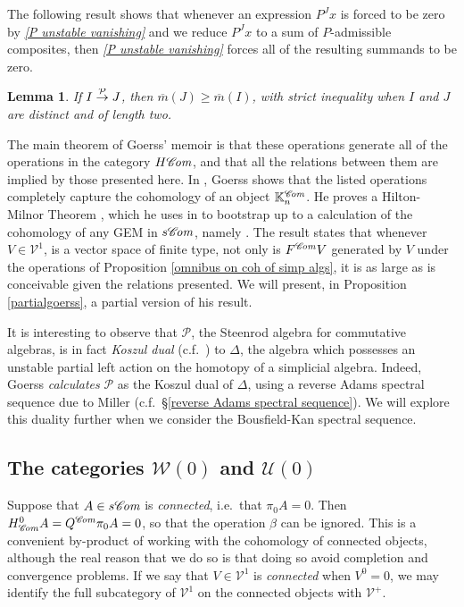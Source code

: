 \documentclass[11pt]{amsart} \renewcommand{\baselinestretch}{1.2}
\theoremstyle{plain}
\newtheorem{lem}[thm]{Lemma}
\numberwithin{equation}{section} %
\theoremstyle{plain}
\newtheorem{lem}[thm]{Lemma}
\numberwithin{equation}{chapter} %
\newcommand{\scrC}{\mathscr{C}}
\newcommand{\calU}{\mathcal{U}}
\newcommand{\calP}{\mathcal{P}}
\newcommand{\calV}{\mathcal{V}}
\newcommand{\calw}{\mathcal{W}}
\newcommand{\citeBOX}[2][]{\cite[\mbox{#1}]{#2}}
\newcommand{\Palg}{{\calP}}
\newcommand{\deltaalg}{\Delta} %
\newcommand{\vect}[2]{\calV^{#1}_{#2}}
\newcommand{\HA}[1]{H#1}
\newcommand{\minDimP}{\overline{m}}
\newcommand{\produces}[3]{#3:#1\sim #2}
\renewcommand{\produces}[3]{#1\rightarrow_{#3} #2}%
\renewcommand{\produces}[3]{#1\overset{\smash{#3}}{\rightarrow} #2}%
\newcommand{\algs}{{\scrC\!\textit{\normalfont\textit{om}}}}
\newcommand{\SubsectionOrSection}[1]{\subsection{#1}}
\begin{document}
\begin{Constructing cohomology operations}
The following result shows that whenever an expression $P^Jx$ is forced to be zero by \emph{\ref{P unstable vanishing}}  and we reduce $P^Jx$ to a sum of $P$-admissible composites, then \emph{\ref{P unstable vanishing}} forces all of the resulting summands  to be zero.
\begin{lem}
\label{lemOnAdemChangeInMP}
If $\produces{I}{J}{\Palg}$, then $\minDimP(J) \geq \minDimP(I)$, with strict inequality when $I$ and $J$ are distinct and of length two.
\end{lem}
The main theorem of Goerss' memoir is that these operations generate all of the operations in the category $\HA{\algs}$, and that all  the relations between them  are implied by those presented here. In \cite[Chapter V]{MR1089001}, Goerss shows that the listed operations completely capture the cohomology of an object $\mathbb{K}_n^{\algs}$. He proves a Hilton-Milnor Theorem \cite{GoerssHiltonMilnor.pdf}, which he uses in \citeBOX[\S11]{MR1089001} to bootstrap up to a calculation of the cohomology of any GEM in $s\algs$, namely \cite[Theorem I]{MR1089001}. The result states that whenever $V\in \vect{1}{}$,  is a  vector space of finite type, not only is 
$F^{\algs}V$
generated by $V$ under the operations of Proposition \ref{omnibus on coh of simp algs}, it is as large as is conceivable given the relations presented. We will present, in Proposition \ref{partialgoerss}, a partial version of his result.

It is  interesting to observe that $\Palg$, the Steenrod algebra for commutative algebras, is
in fact \emph{Koszul dual} (c.f.\ \cite{PriddyKoszul.pdf}) to $\deltaalg$, the algebra which possesses an unstable partial left action on the homotopy of a simplicial algebra. Indeed, Goerss \emph{calculates} $\Palg$ as the Koszul dual of $\deltaalg$, using a reverse Adams spectral sequence due to Miller \cite{MillerSullivanConjecture.pdf} (c.f.\ \S\ref{reverse Adams spectral sequence}). We will explore this duality further when we consider the Bousfield-Kan spectral sequence.

\SubsectionOrSection{The categories $\calw(0)$ and $\calU(0)$}
Suppose that $A\in s\algs$ is \emph{connected}, i.e.\ that $\pi_0A=0$. Then $H^0_{\algs}A=Q^{\algs}\pi_0A=0$, so that the operation $\beta$ can be ignored. This is a convenient by-product of working with the cohomology of connected objects, although the real reason that we do so is that doing so avoid completion and convergence problems. If we say that $V\in \vect{1}{}$ is \emph{connected} when $V^{0}=0$, we may identify the full subcategory of $\vect{1}{}$ on the connected objects with $\vect{+}{}$.


\end{Constructing cohomology operations}
\end{document}
